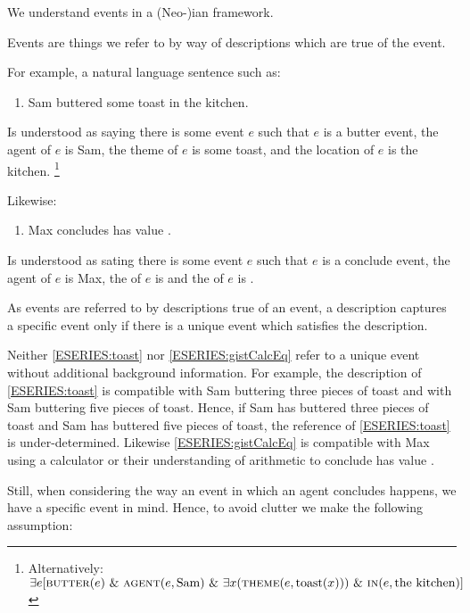 \begin{note}
  We understand events in a (Neo-)\citeauthor{Davidson:1967aa}ian framework.

  Events are things we refer to by way of descriptions which are true of the event.

  For example, a natural language sentence such as:
  \begin{enumerate}[label=\arabic*., ref=(\arabic*), series=ESERIES]
  \item
    \label{ESERIES:toast}
    Sam buttered some toast in the kitchen.
  \end{enumerate}
  Is understood as saying there is some event \(e\) such that \(e\) is a butter event, the agent of \(e\) is Sam, the theme of \(e\) is some toast, and the location of \(e\) is the kitchen.%
  \footnote{
    Alternatively:
    \(\exists e [\textsc{butter}(e)\text{ \& }\textsc{agent}(e, \text{Sam})\text{ \& }\exists x(\textsc{theme}(e, \text{toast}(x)))\text{ \& }\textsc{in}(e, \text{the kitchen})]\)
  }

  Likewise:
  \begin{enumerate}[label=\arabic*., ref=(\arabic*), resume*=ESERIES]
  \item
    \label{ESERIES:gistCalcEq}
    Max concludes \gistCalcEq{} has value .
  \end{enumerate}
  Is understood as sating there is some event \(e\) such that \(e\) is a conclude event, the agent of \(e\) is Max, the  of \(e\) is \gistCalcEq{} and the \val{} of \(e\) is .

  As events are referred to by descriptions true of an event, a description captures a specific event only if there is a unique event which satisfies the description.

  Neither \ref{ESERIES:toast} nor \ref{ESERIES:gistCalcEq} refer to a unique event without additional background information.
  For example, the description of \ref{ESERIES:toast} is compatible with Sam buttering three pieces of toast and with Sam buttering five pieces of toast.
  Hence, if Sam has buttered three pieces of toast and Sam has buttered five pieces of toast, the reference of \ref{ESERIES:toast} is under-determined.
  Likewise \ref{ESERIES:gistCalcEq} is compatible with Max using a calculator or their understanding of arithmetic to conclude \gistCalcEq{} has value .

  Still, when considering the way an event in which an agent concludes happens, we have a specific event in mind.
  Hence, to avoid clutter we make the following assumption:


\end{note}
